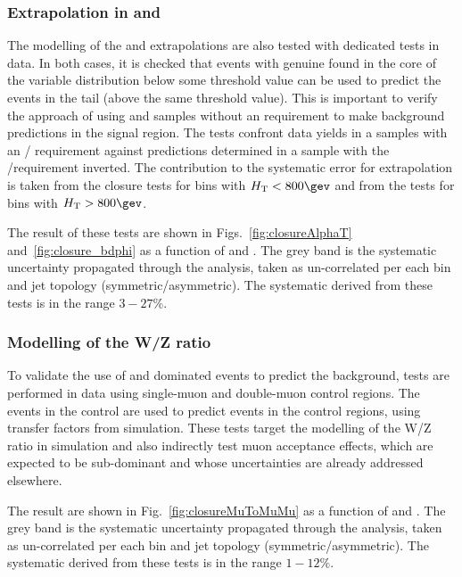 \subsubsection*{Extrapolation in \alphat and \bdphi}
\label{sec:tfSyst_alphaT}
The modelling of the \alphat and
\bdphi extrapolations are also tested with dedicated tests in data. 
In both cases, it is checked that events with genuine \met found in the core
of the variable distribution below some threshold value can be used to
predict the events in the tail (above the same threshold value).
This is important to verify the
approach of using \mj and \mmj samples without an \alphat requirement
to make background predictions in the signal region. The tests
confront data yields in a \mj  samples with an \alphat /\bdphi
requirement against predictions determined in a \mj sample with
the \alphat /\bdphi requirement inverted. 
The contribution to the systematic error for \met extrapolation is taken
from the \alphat closure tests for bins with $\scalht<800\gev$ and from 
the \bdphi tests for bins with $\scalht>800\gev$. 

The result of these tests are shown in Figs.~\ref{fig:closureAlphaT}
and~\ref{fig:closure_bdphi} as a function of \scalht and \njet. 
The grey band is the systematic uncertainty propagated through the analysis, 
taken as un-correlated per each \scalht bin and jet topology
(symmetric/asymmetric). The systematic derived from these tests is
in the range $3-27\%$.

\subsubsection*{Modelling of the W/Z ratio}
\label{sec:tfSyst_WZratio}
To validate the use of \wmj and \ttbar dominated \mj events to predict the \znunu
background, tests are performed in data using single-muon and double-muon control regions. 
The events in the \mj control are used to predict events in the \mmj control regions, 
using transfer factors from simulation. 
These tests target the modelling of the W/Z ratio in simulation and 
also indirectly test muon acceptance effects, which 
are expected to be sub-dominant and whose uncertainties are already addressed elsewhere.

The result are shown in Fig.~\ref{fig:closureMuToMuMu} as a function of \scalht and \njet. 
The grey band is the systematic uncertainty propagated through the analysis, 
taken as un-correlated per each \scalht bin and jet topology (symmetric/asymmetric). The systematic derived from these tests is
in the range $1-12\%$.

